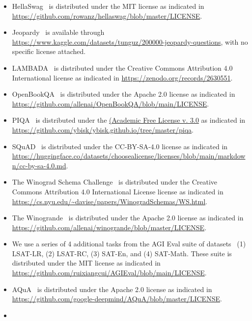 \documentclass{article}
\begin{document}
\begin{itemize}
\begin{itemize}
        \item News passages are collected from the DeepMind CNN dataset which comes with Apache license.
        \end{itemize}
    \item
    HellaSwag~\citep{hellaswag}  is distributed under the MIT license as indicated in \url{https://github.com/rowanz/hellaswag/blob/master/LICENSE}.
    \item
    Jeopardy~\citep{kaggle200000Jeopardy} is available through \url{https://www.kaggle.com/datasets/tunguz/200000-jeopardy-questions}, with no specific license attached.
    \item
    LAMBADA~\citep{lambada}  is distributed under the Creative Commons Attribution 4.0 International license as indicated in \url{https://zenodo.org/records/2630551}.
    \item
    OpenBookQA~\citep{OpenBookQA2018} is distributed under the Apache 2.0 license as indicated in \url{https://github.com/allenai/OpenBookQA/blob/main/LICENSE}.
    \item
    PIQA~\citep{piqa}  is distributed under the \href{https://opensource.org/licenses/AFL-3.0}{(Academic Free License v. 3.0} as indicated in \url{https://github.com/ybisk/ybisk.github.io/tree/master/piqa}.
    \item
    SQuAD~\citep{squad}  is distributed under the CC-BY-SA-4.0 license as indicated in \url{https://huggingface.co/datasets/choosealicense/licenses/blob/main/markdown/cc-by-sa-4.0.md}.
    \item
    The Winograd Schema Challenge~\citep{winograd} is distributed under the Creative Commons Attribution 4.0 International License license as indicated in \url{https://cs.nyu.edu/~davise/papers/WinogradSchemas/WS.html}.
    \item
    The Winogrande~\citep{sakaguchi2019winogrande}  is distributed under the Apache 2.0 license as indicated in \url{https://github.com/allenai/winogrande/blob/master/LICENSE}.
    \item
    We use a series of 4 additional tasks from the AGI Eval suite of datasets~\citep{zhong2023agieval} (1) LSAT-LR, (2) LSAT-RC, (3) SAT-En, and (4) SAT-Math. These suite  is distributed under the MIT license as indicated in \url{https://github.com/ruixiangcui/AGIEval/blob/main/LICENSE}.
    \item
    AQuA~\citep{ling2017program}  is distributed under the Apache 2.0 license as indicated in \url{https://github.com/google-deepmind/AQuA/blob/master/LICENSE}.
    \item

\end{itemize}
\end{document}
